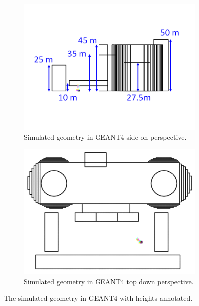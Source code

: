 \begin{figure}[htbp]
\centering
\begin{subfigure}{.5\textwidth}
  \centering
  \includegraphics[width=\linewidth]{Chapter5/Figs/wylfaRasterNew/WylfaSimGeomSideOn.png}
  \captionsetup{width=.9\linewidth}
  \caption{Simulated geometry in GEANT4 side on perspective.}
  \label{subFig:WylfaSimGeomSideOn}
\end{subfigure}%
\begin{subfigure}{.5\textwidth}
  \centering
\includegraphics[width=\linewidth]{Chapter5/Figs/wylfaRasterNew/WylfaSimGeomTopDown.png}
  \captionsetup{width=.9\linewidth}
  \caption{Simulated geometry in GEANT4 top down perspective.}
  \label{subFig:WylfaSimGeomTopDown}
\end{subfigure}
\caption{The simulated geometry in GEANT4 with heights annotated.}
\label{fig:WylfaSimGeom_SideOn_TopDown}
\end{figure}

